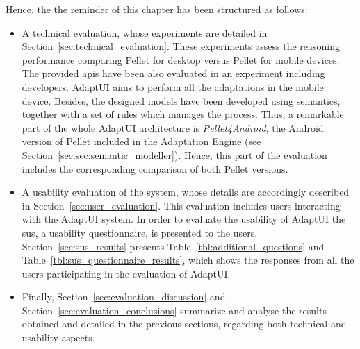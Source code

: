 Hence, the the reminder of this chapter has been structured as follows: 

\begin{itemize}
  \item A technical evaluation, whose experiments are detailed in 
  Section~\ref{sec:technical_evaluation}. These experiments assess the 
  reasoning performance comparing Pellet for desktop versus Pellet for mobile 
  devices. The provided \acp{api} have been also evaluated in an experiment
  including developers. AdaptUI aims to perform all the adaptations in the
  mobile device. Besides, the designed models have been developed using semantics,
  together with a set of rules which manages the process. Thus, a remarkable
  part of the whole AdaptUI architecture is \textit{Pellet4Android}, the Android
  version of Pellet included in the Adaptation Engine (see Section~\ref{sec:sec:semantic_modeller}).
  Hence, this part of the evaluation includes the corresponding comparison of
  both Pellet versions.
  
  \item A usability evaluation of the system, whose details are accordingly 
  described in Section~\ref{sec:user_evaluation}. This evaluation includes 
  users interacting with the AdaptUI system. In order to evaluate the usability 
  of AdaptUI the \ac{sus}, a usability questionnaire, is presented to the users. 
  Section~\ref{sec:sus_results} presents Table~\ref{tbl:additional_questions} and
  Table~\ref{tbl:sus_questionnaire_results}, which shows the responses from all
  the users participating in the evaluation of AdaptUI.

  \item Finally, Section~\ref{sec:evaluation_discussion} and 
  Section~\ref{sec:evaluation_conclusions} summarize and analyse the results
  obtained and detailed in the previous sections, regarding both technical and
  usability aspects.
\end{itemize}





%

% 

